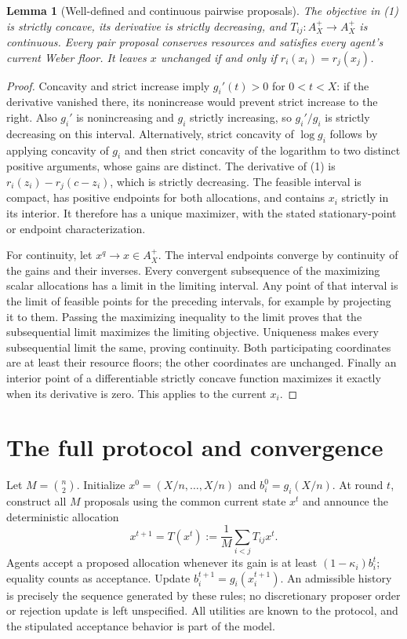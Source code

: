 \documentclass[11pt]{article}
\newtheorem{lemma}[theorem]{Lemma}
\theoremstyle{remark}\newtheorem{remark}[theorem]{Remark}
\begin{document}
\begin{lemma}[Well-defined and continuous pairwise proposals]
The objective in (1) is strictly concave, its derivative is strictly decreasing, and $T_{ij}:A_X^+\to A_X^+$ is continuous. Every pair proposal conserves resources and satisfies every agent's current Weber floor. It leaves $x$ unchanged if and only if $r_i(x_i)=r_j(x_j)$.
\end{lemma}
\begin{proof}
Concavity and strict increase imply $g_i'(t)>0$ for $0<t<X$: if the derivative vanished there, its nonincrease would prevent strict increase to the right. Also $g_i'$ is nonincreasing and $g_i$ strictly increasing, so $g_i'/g_i$ is strictly decreasing on this interval. Alternatively, strict concavity of $\log g_i$ follows by applying concavity of $g_i$ and then strict concavity of the logarithm to two distinct positive arguments, whose gains are distinct. The derivative of (1) is $r_i(z_i)-r_j(c-z_i)$, which is strictly decreasing. The feasible interval is compact, has positive endpoints for both allocations, and contains $x_i$ strictly in its interior. It therefore has a unique maximizer, with the stated stationary-point or endpoint characterization.

For continuity, let $x^q\to x\in A_X^+$. The interval endpoints converge by continuity of the gains and their inverses. Every convergent subsequence of the maximizing scalar allocations has a limit in the limiting interval. Any point of that interval is the limit of feasible points for the preceding intervals, for example by projecting it to them. Passing the maximizing inequality to the limit proves that the subsequential limit maximizes the limiting objective. Uniqueness makes every subsequential limit the same, proving continuity. Both participating coordinates are at least their resource floors; the other coordinates are unchanged. Finally an interior point of a differentiable strictly concave function maximizes it exactly when its derivative is zero. This applies to the current $x_i$.
\end{proof}

\section*{The full protocol and convergence}
Let $M=\binom n2$. Initialize $x^0=(X/n,\ldots,X/n)$ and $b_i^0=g_i(X/n)$. At round $t$, construct all $M$ proposals using the common current state $x^t$ and announce the deterministic allocation
\[
 x^{t+1}=T(x^t):=\frac1M\sum_{i<j}T_{ij}x^t.
 \tag{2}
\]
Agents accept a proposed allocation whenever its gain is at least $(1-\kappa_i)b_i^t$; equality counts as acceptance. Update $b_i^{t+1}=g_i(x_i^{t+1})$. An admissible history is precisely the sequence generated by these rules; no discretionary proposer order or rejection update is left unspecified. All utilities are known to the protocol, and the stipulated acceptance behavior is part of the model.
\end{document}
